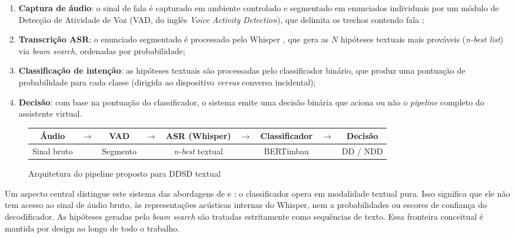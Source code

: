 \documentclass[
    12pt,                %
    openright,           %
    oneside,             %
    a4paper,             %
    english,             %
    brazil               %
]{abntex2}
\begin{document}
\begin{enumerate}
    \item \textbf{Captura de áudio}: o sinal de fala é capturado em ambiente controlado e segmentado em enunciados individuais por um módulo de Detecção de Atividade de Voz (VAD, do inglês \textit{Voice Activity Detection}), que delimita os trechos contendo fala \cite{Li2021};

    \item \textbf{Transcrição ASR}: o enunciado segmentado é processado pelo Whisper \cite{Radford2023}, que gera as $N$ hipóteses textuais mais prováveis (\textit{n-best list}) via \textit{beam search}, ordenadas por probabilidade;

    \item \textbf{Classificação de intenção}: as hipóteses textuais são processadas pelo classificador binário, que produz uma pontuação de probabilidade para cada classe (dirigida ao dispositivo \textit{versus} conversa incidental);

    \item \textbf{Decisão}: com base na pontuação do classificador, o sistema emite uma decisão binária que aciona ou não o \textit{pipeline} completo do assistente virtual.
\end{enumerate}

\begin{figure}[H]
    \centering
    \caption{Arquitetura do pipeline proposto para DDSD textual}
    \label{fig:pipeline}
    \begin{tabular}{ccccccccc}
        \toprule
        \textbf{Áudio} &
        $\rightarrow$ &
        \textbf{VAD} &
        $\rightarrow$ &
        \textbf{ASR (Whisper)} &
        $\rightarrow$ &
        \textbf{Classificador} &
        $\rightarrow$ &
        \textbf{Decisão} \\
        \midrule
        Sinal bruto &&
        Segmento &&
        \textit{n-best} textual &&
        BERTimbau &&
        DD / NDD \\
        \bottomrule
    \end{tabular}
\end{figure}

Um aspecto central distingue este sistema das abordagens de  e : o classificador opera em modalidade textual pura. Isso significa que ele não tem acesso ao sinal de áudio bruto, às representações acústicas internas do Whisper, nem a probabilidades ou escores de confiança do decodificador. As hipóteses geradas pelo \textit{beam search} são tratadas estritamente como sequências de texto. Essa fronteira conceitual é mantida por design ao longo de todo o trabalho.
\end{document}
